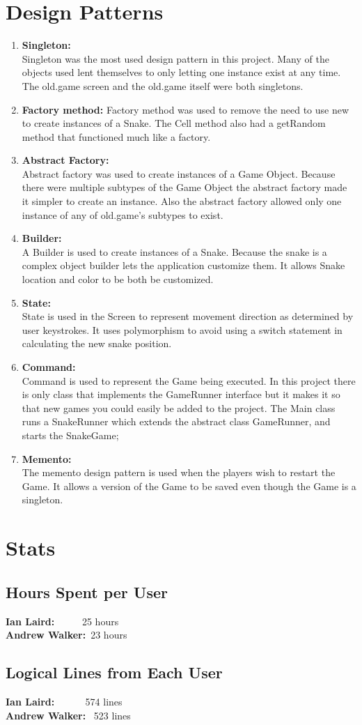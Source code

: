 \documentclass[titlepage]{article}
\begin{document}
	\section{Design Patterns}
		\begin{enumerate}
			\item \textbf{Singleton:}\\
				Singleton was the most used design pattern in this project. Many of the objects used lent themselves to only letting one instance exist at any
				time. The old.game screen and the old.game itself were both singletons.
			\item \textbf{Factory method:}
				Factory method was used to remove the need to use new to create instances of a Snake. The Cell method also had a getRandom method that functioned much like a factory.
			\item \textbf{Abstract Factory:}\\
				Abstract factory was used to create instances of a Game Object. Because there were multiple subtypes of the Game Object the abstract factory made it simpler to create an instance. Also the abstract factory allowed only one instance of any of old.game's subtypes to exist.
			\item \textbf{Builder:}\\
				A Builder is used to create instances of a Snake. Because the snake is a complex object builder lets the application customize them. It allows Snake location and color to be both be customized.
			\item \textbf{State:}\\
				State is used in the Screen to represent movement direction as determined by user keystrokes. It uses polymorphism to avoid using a switch statement in calculating the new snake position.
			\item \textbf{Command:}\\
				Command is used to represent the Game being executed. In this project there is only class that implements the GameRunner interface but it makes it so that new games you could easily be added to the project. The Main class runs a SnakeRunner which extends the abstract class GameRunner, and starts the SnakeGame;
			\item \textbf{Memento:}\\
				The memento design pattern is used when the players wish to restart the Game. It allows a version of the Game to be saved even though the Game is a singleton.
		\end{enumerate}
	\section{Stats}
	\subsection{Hours Spent per User}
	\textbf{Ian Laird:} ~~~~~25 hours\\
	\textbf{Andrew Walker:}~23 hours
	\subsection{Logical Lines from Each User}
	\textbf{Ian Laird:} ~~~~~ 574 lines\\
	\textbf{Andrew Walker:}~ 523 lines
\end{document}
